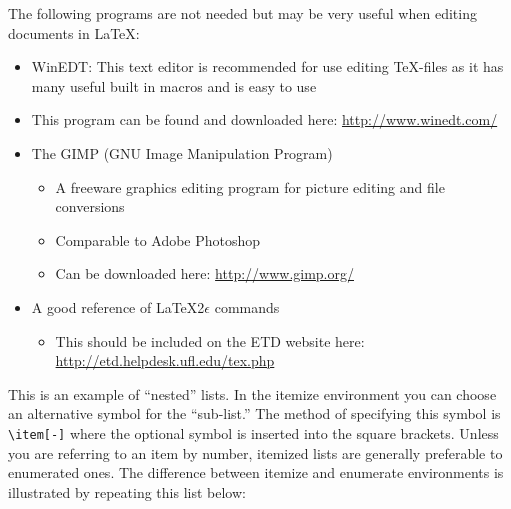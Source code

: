The following programs are not needed but may be very useful when editing documents in \LaTeX:  \begin{itemize} %
    \item WinEDT: This text editor is recommended for use editing \TeX-files as it has many useful built in macros and is easy to use  %
    \item This program can be found and downloaded here: \url{http://www.winedt.com/} %
    \item The GIMP (GNU Image Manipulation Program) %
    \begin{itemize}%
        \item A freeware graphics editing program for picture editing and file conversions %
        \item Comparable to Adobe Photoshop %
        \item Can be downloaded here: \url{http://www.gimp.org/}%
    \end{itemize}
    \item A good reference of \LaTeX 2\ensuremath{\epsilon} commands%
    \begin{itemize}
        \item This should be included on the ETD website here: \url{http://etd.helpdesk.ufl.edu/tex.php}
    \end{itemize}
\end{itemize} %
This is an example of ``nested'' lists. In the itemize environment you can choose an alternative symbol for the ``sub-list.'' The method of specifying this symbol is \verb=\item[-]= where the optional symbol is inserted into the square brackets. Unless you are referring to an item by number, itemized lists are generally preferable to enumerated ones. The difference between itemize and enumerate environments is illustrated by repeating this list below: 
